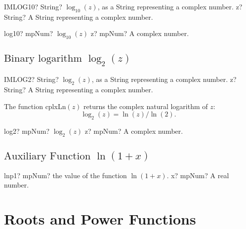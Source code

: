\vspace{0.6cm}
\begin{mpFunctionsExtract}
	\mpWorksheetFunctionOneNotImplemented
	{IMLOG10? String? $\log_{10}(z)$, as a String representing a complex number.}
	{z? String? A String representing a complex number.}
\end{mpFunctionsExtract}


\begin{mpFunctionsExtract}
	\mpFunctionOne
	{log10? mpNum? $\log_{10}(z)$}
	{z? mpNum? A complex number.}
\end{mpFunctionsExtract}



\subsection{\texorpdfstring{$\text{Binary logarithm }\log_2(z)$}{log2}}

\vspace{0.6cm}
\begin{mpFunctionsExtract}
	\mpWorksheetFunctionOneNotImplemented
	{IMLOG2? String? $\log_{2}(z)$, as a String representing a complex number.}
	{z? String? A String representing a complex number.}
\end{mpFunctionsExtract}

\vspace{0.3cm}
The function \textsf{cplxLn$(z)$} returns the complex natural logarithm of $z$: 
\begin{equation}
	\log_{2}(z) =  \ln(z)/\ln(2).
\end{equation}


\begin{mpFunctionsExtract}
	\mpFunctionOne
	{log2? mpNum? $\log_{2}(z)$}
	{z? mpNum? A complex number.}
\end{mpFunctionsExtract}


\subsection{\texorpdfstring{$\text{Auxiliary Function }\ln(1+x)$}{lnp1}}

\begin{mpFunctionsExtract}
	\mpFunctionOne
	{lnp1? mpNum? the value of the function $\ln(1+x)$.}
	{x? mpNum? A real number.}
\end{mpFunctionsExtract}






\newpage
\section{Roots and Power Functions}
\label{RootsAndPowersCplx}


